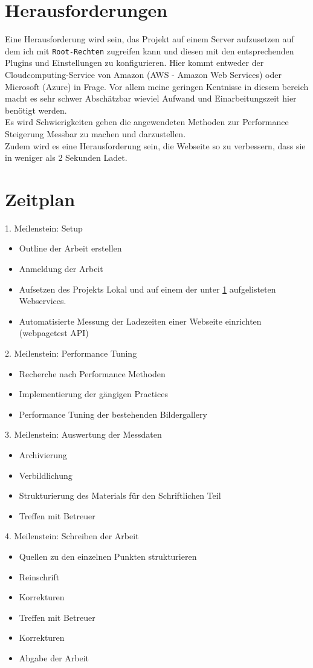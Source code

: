 \documentclass[a4paper,11pt,singlespacing]{article}
\begin{document}
\section{Herausforderungen} %
\label{sec:herausforderungen}
	Eine Herausforderung wird sein, das Projekt auf einem Server aufzusetzen auf dem ich mit \texttt{Root-Rechten} zugreifen kann und diesen mit den entsprechenden Plugins und Einstellungen zu konfigurieren. Hier kommt entweder der Cloudcomputing-Service von Amazon (AWS - Amazon Web Services) oder Microsoft (Azure) in Frage. Vor allem meine geringen Kentnisse in diesem bereich macht es sehr schwer Abschätzbar wieviel Aufwand und Einarbeitungszeit hier benötigt werden.\\
	Es wird Schwierigkeiten geben die angewendeten Methoden zur Performance Steigerung Messbar zu machen und darzustellen. \\
	Zudem wird es eine Herausforderung sein, die Webseite so zu verbessern, dass sie in weniger als 2 Sekunden Ladet. 

\section{Zeitplan} %
\label{sec:zeitplan}
	1. Meilenstein: Setup
	\begin{itemize}
		\item Outline der Arbeit erstellen
		\item Anmeldung der Arbeit
		\item Aufsetzen des Projekts Lokal und auf einem der unter \ref{sec:herausforderungen} aufgelisteten Webservices.
		\item Automatisierte Messung der Ladezeiten einer Webseite einrichten (webpagetest API)
	\end{itemize}

	2. Meilenstein: Performance Tuning
	\begin{itemize}
		\item Recherche nach Performance Methoden
		\item Implementierung der gängigen Practices
		\item Performance Tuning der bestehenden Bildergallery
	\end{itemize}

	3. Meilenstein: Auswertung der Messdaten
	\begin{itemize}
		\item Archivierung
		\item Verbildlichung
		\item Strukturierung des Materials für den Schriftlichen Teil
		\item Treffen mit Betreuer
	\end{itemize}

	4. Meilenstein: Schreiben der Arbeit
	\begin{itemize}
		\item Quellen zu den einzelnen Punkten strukturieren
		\item Reinschrift
		\item Korrekturen
		\item Treffen mit Betreuer
		\item Korrekturen
		\item Abgabe der Arbeit
	\end{itemize}


\pagebreak
\printbibliography
\end{document}
